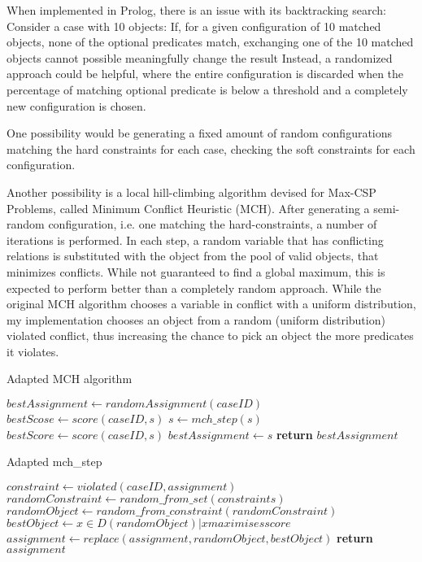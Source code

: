 When implemented in Prolog, there is an issue with its backtracking search: Consider a case with 10 objects: If, for a given configuration of 10 matched objects, none of the optional predicates match, exchanging one of the 10 matched objects cannot possible meaningfully change the result
Instead, a randomized approach could be helpful, where the entire configuration is discarded when the percentage of matching optional predicate is below a threshold and a completely new configuration is chosen.

One possibility would be generating a fixed amount of random configurations matching the hard constraints for each case, checking the soft constraints for each configuration.

Another possibility is a local hill-climbing algorithm devised for Max-CSP Problems, called Minimum Conflict Heuristic (MCH)\cite{Minton1992MinimizingCA}. After generating a semi-random configuration, i.e. one matching the hard-constraints, a number of iterations is performed. In each step, a random variable that has conflicting relations is substituted with the object from the pool of valid objects, that minimizes conflicts. While not guaranteed to find a global maximum, this is expected to perform better than a completely random approach.
While the original MCH algorithm chooses a variable in conflict with a uniform distribution, my implementation chooses an object from a random (uniform distribution) violated conflict, thus increasing the chance to pick an object the more predicates it violates.

\begin{algorithm}
    \caption{Adapted MCH algorithm}\label{alog:mch}
    \begin{algorithmic}[1]
        \State $bestAssignment\gets randomAssignment(caseID)$
        \State $bestScose \gets score(caseID, s)$
        \State $s\gets mch\_step(s)$
        \State $bestScore\gets score(caseID, s)$
        \State $bestAssignment\gets s$
        \EndIf
        \EndWhile\label{euclidendwhile}
        \State \textbf{return} $bestAssignment$
        \EndProcedure
    \end{algorithmic}
\end{algorithm}


\begin{algorithm}
    \caption{Adapted mch\_step}\label{algo:mch_step}
    \begin{algorithmic}[1]
        \State $constraint \gets violated(caseID, assignment)$
        \State $randomConstraint\gets random\_from\_set(constraints)$
        \State $randomObject \gets random\_from\_constraint(randomConstraint)$
        \State $bestObject \gets {x \in D(randomObject) \vert x maximises score}$
        \State $assignment \gets replace(assignment, randomObject, bestObject)$
        \State \textbf{return} $assignment$
        \EndProcedure
    \end{algorithmic}
\end{algorithm}

